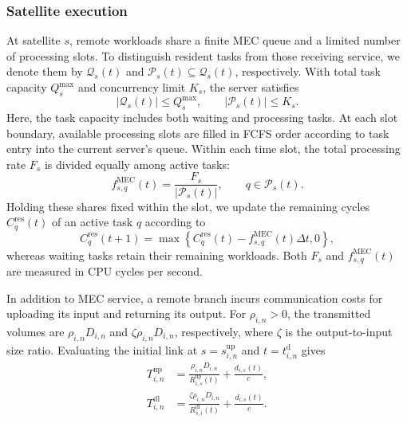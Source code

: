 \documentclass[journal]{IEEEtran}
\begin{document}
\subsubsection{Satellite execution}

At satellite $s$, remote workloads share a finite MEC
queue and a limited number of processing slots.
To distinguish resident tasks from those receiving
service, we denote them by $\mathcal{Q}_s(t)$ and
$\mathcal{P}_s(t)\subseteq\mathcal{Q}_s(t)$, respectively.
With total task capacity $Q_s^{\max}$ and concurrency
limit $K_s$, the server satisfies
\begin{equation}
|\mathcal{Q}_s(t)|\leq Q_s^{\max},
\qquad
|\mathcal{P}_s(t)|\leq K_s.
\label{eq:mec_capacity}
\end{equation}
Here, the task capacity includes both waiting and
processing tasks. At each slot boundary, available processing slots
are filled in FCFS order according to task entry
into the current server's queue.
Within each time slot, the total processing rate
$F_s$ is divided equally among active tasks:
\begin{equation}
f^{\mathrm{MEC}}_{s,q}(t)
=\frac{F_s}{|\mathcal{P}_s(t)|},
\qquad q\in\mathcal{P}_s(t).
\label{eq:mec_rate}
\end{equation}
Holding these shares fixed within the slot, we update
the remaining cycles $C_q^{\mathrm{res}}(t)$ of an
active task $q$ according to
\begin{equation}
C_q^{\mathrm{res}}(t+1)=
\max\left\{
C_q^{\mathrm{res}}(t)
-f^{\mathrm{MEC}}_{s,q}(t)\Delta t,0
\right\},
\label{eq:remaining_workload}
\end{equation}
whereas waiting tasks retain their remaining workloads.
Both $F_s$ and $f^{\mathrm{MEC}}_{s,q}(t)$ are measured
in CPU cycles per second.

In addition to MEC service, a remote branch incurs
communication costs for uploading its input and returning
its output. For $\rho_{i,n}>0$, the transmitted volumes
are $\rho_{i,n}D_{i,n}$ and
$\zeta\rho_{i,n}D_{i,n}$, respectively, where $\zeta$
is the output-to-input size ratio. Evaluating the initial
link at $s=s_{i,n}^{\mathrm{up}}$ and
$t=t_{i,n}^{\mathrm d}$ gives
\begin{align}
T^{\mathrm{up}}_{i,n}
&=\frac{\rho_{i,n}D_{i,n}}
{R^{\mathrm{up}}_{i,s}(t)}
+\frac{d_{i,s}(t)}{c},
\label{eq:upload_delay}\\
T^{\mathrm{dl}}_{i,n}
&=\frac{\zeta\rho_{i,n}D_{i,n}}
{R^{\mathrm{dl}}_{s,i}(t)}
+\frac{d_{i,s}(t)}{c}.
\label{eq:download_delay}
\end{align}
\end{document}
